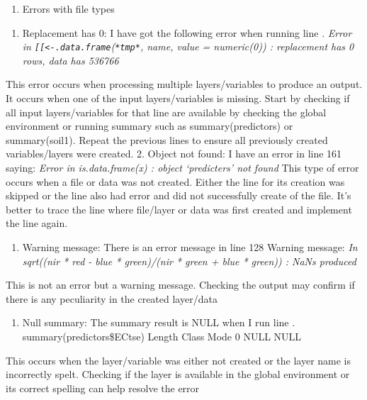 \documentclass[
  10pt,
  b5paper,
]{book}
\providecommand{\tightlist}{%
  \setlength{\itemsep}{0pt}\setlength{\parskip}{0pt}}
\begin{document}
\begin{enumerate}
\def\labelenumi{\Alph{enumi}.}
\tightlist
\item
  Errors with file types
\end{enumerate}

\begin{enumerate}
\def\labelenumi{\arabic{enumi}.}
\tightlist
\item
  Replacement has 0: I have got the following error when running line .
  \emph{Error in \texttt{{[}{[}\textless{}-.data.frame}(\texttt{*tmp*}, name, value = numeric(0)) : replacement has 0 rows, data has 536766}
\end{enumerate}

This error occurs when processing multiple layers/variables to produce an output. It occurs when one of the input layers/variables is missing. Start by checking if all input layers/variables for that line are available by checking the global environment or running summary such as summary(predictors) or summary(soil1). Repeat the previous lines to ensure all previously created variables/layers were created.
2. Object not found: I have an error in line 161 saying:
\emph{Error in is.data.frame(x) : object `predicters' not found}
This type of error occurs when a file or data was not created. Either the line for its creation was skipped or the line also had error and did not successfully create of the file. It's better to trace the line where file/layer or data was first created and implement the line again.

\begin{enumerate}
\def\labelenumi{\arabic{enumi}.}
\setcounter{enumi}{2}
\tightlist
\item
  Warning message: There is an error message in line 128
  Warning message:
  \emph{In sqrt((nir * red - blue * green)/(nir * green + blue * green)) : NaNs produced}
\end{enumerate}

This is not an error but a warning message. Checking the output may confirm if there is any peculiarity in the created layer/data

\begin{enumerate}
\def\labelenumi{\arabic{enumi}.}
\setcounter{enumi}{3}
\tightlist
\item
  Null summary: The summary result is NULL when I run line .
  summary(predictors\$ECtse)
  Length Class Mode
  0 NULL NULL
\end{enumerate}

This occurs when the layer/variable was either not created or the layer name is incorrectly spelt. Checking if the layer is available in the global environment or its correct spelling can help resolve the error
\end{document}
